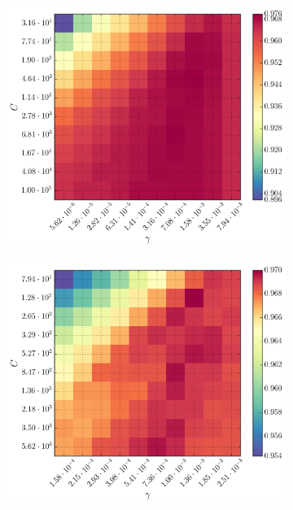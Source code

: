 \begin{figure}[h]
\begin{subfigure}[t]{0.49\textwidth}
	\end{subfigure}
	\begin{subfigure}[t]{0.49\textwidth}
		\centering
		\includegraphics[width=\textwidth]{figures/gridsearch/svm/superclasses/svm-superclasses-03.png}				
	\end{subfigure}
	\begin{subfigure}[t]{0.49\textwidth}
		\centering
		\includegraphics[width=\textwidth]{figures/gridsearch/svm/superclasses/svm-superclasses-04.png}		

\end{subfigure}
\end{figure}
